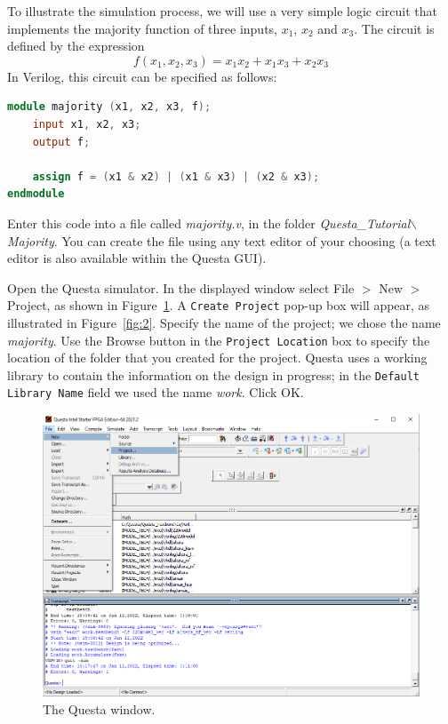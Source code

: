 \documentclass[11pt, twoside, pdftex]{article}
\begin{document}
To illustrate the simulation process, we will use a very simple logic circuit that 
implements the majority function of three inputs, $x_1$, $x_2$ and $x_3$. The circuit
is defined by the expression
$$
f(x_1, x_2, x_3) = x_1 x_2 + x_1 x_3 + x_2 x_3
$$
\noindent
In Verilog, this circuit can be specified as follows:
~\\
\begin{lstlisting}[language=Verilog]
module majority (x1, x2, x3, f);
    input x1, x2, x3;
    output f;

    assign f = (x1 & x2) | (x1 & x3) | (x2 & x3);
endmodule
\end{lstlisting}
\noindent
Enter this code into a file called {\it majority.v}, in the folder 
{\it Questa\_Tutorial$\backslash$Majority}.
You can create the file using any text 
editor of your choosing (a text editor is also available within the Questa GUI).

Open the Questa simulator. In the displayed window select {\sf File $>$ New $>$ Project},
as shown in Figure~\ref{fig:1}.
A \texttt{Create Project} pop-up box will appear, as illustrated in Figure~\ref{fig:2}. 
Specify the name of the project; we chose the name {\it majority}. 
Use the {\sf Browse} button in the \texttt{Project Location} box to specify the location
of the folder that you created for the project.
Questa uses a working library to contain the information on the design 
in progress; in the \texttt{Default Library Name} field we used the name {\it work}.
Click {\sf OK}.

\begin{figure}[H]
   \begin{center}
      \includegraphics[scale=0.65]{figures/figure1.png}
   \caption{The Questa window.} 
	 \label{fig:1}
	 \end{center}
\end{figure}
\end{document}
